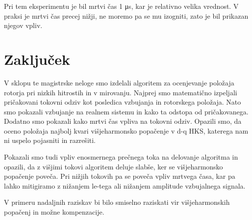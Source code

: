 \documentclass[a4paper,twoside,openright,12pt,slovene]{book}
\begin{document}
Pri tem eksperimentu je bil mrtvi čas 1 μs, kar je relativno velika vrednost. V praksi je mrtvi čas precej nižji, ne moremo pa se mu izogniti, zato je bil prikazan njegov vpliv.

\chapter{Zaključek} \label{zakljucek}

V sklopu te magistrske neloge smo izdelali algoritem za ocenjevanje položaja rotorja pri nizkih hitrostih in v mirovanju. Najprej smo matematično izpeljali pričakovani tokovni odziv kot posledica
vzbujanja in rotorskega položaja. Nato smo pokazali vzbujanje na realnem sistemu in kako ta odstopa od pričakovanega. Dodatno smo pokazali kako mrtvi čas vpliva na tokovni odziv. Opazili smo, da oceno
položaja najbolj kvari višjeharmonsko popačenje v d-q HKS, katerega nam ni uspelo pojasniti in razrešiti. 

Pokazali smo tudi vpliv enosmernega prečnega toka na delovanje algoritma in opazili, da z višjimi tokovi algoritem deluje slabše, ker se višjeharmonsko popačenje poveča. Pri nižjih tokovih pa se
poveča vpliv mrtvega časa, kar pa lahko mitigiramo z nižanjem le-tega ali nižanjem amplitude vzbujalnega signala.

V primeru nadaljnih raziskav bi bilo smiselno raziskati vir višjeharmonskih popačenj in možne kompenzacije.

\cleardoublepage{} %




\end{document}
